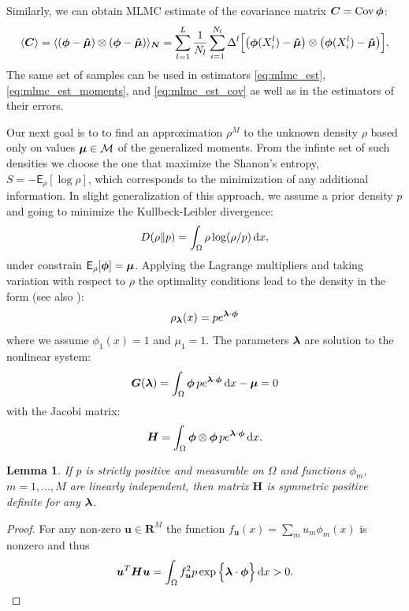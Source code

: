 \documentclass{article}
\newtheorem{lemma}[theorem]{Lemma}
\def\d{\,{\rm d}}               %
\def\vc#1{\mathbf{\boldsymbol{#1}}}     %
\def\tn#1{\boldsymbol{#1}}
\def \E{{\mathsf E}}
\def\R{\mathbf{R}}
\def\avg#1{\langle#1\rangle}
\def\Cov{\mathop{\rm Cov}}
\begin{document}
Similarly, we can obtain MLMC estimate of the covariance matrix $\tn C = \Cov{\vc\phi}$: 
\begin{equation}
    \label{eq:mlmc_est_cov}
    \avg{\tn C} = \avg{(\vphi - \estvmu)\otimes(\vphi - \estvmu)}_{\vc N} = 
    \sum_{l=1}^L \frac{1}{N_l} \sum_{i=1}^{N_l} \Delta^l\Big[ 
    \big(\vphi(X_i^l) - \estvmu\big)\otimes\big(\vphi(X_i^l) - \estvmu\big)\Big].
\end{equation}
The same set of samples can be used in estimators \eqref{eq:mlmc_est}, \eqref{eq:mlmc_est_moments}, and \eqref{eq:mlmc_est_cov} as well as in the estimators of their errors.


Our next goal is to to find an approximation $\rho^M$ to the unknown density $\rho$ based only on values $\vmu \in \mathcal M$ of the generalized moments. From the infinte set of such densities we choose the one that maximize the Shanon's entropy,
$S = -\E_\rho[\log \rho]$,
which corresponds to the minimization of any additional information. 
In slight generalization of this approach, we assume a prior density $p$ and going to minimize the Kullbeck-Leibler divergence:
\[
    D(\rho\Vert p) = \int_\Omega \rho \log(\rho / p) \d x,
\]
under constrain $\E_\rho[ \vphi ] = \vmu$. 
Applying the Lagrange multipliers and taking variation with respect to $\rho$ the optimality conditions lead to the density in the form (see also \cite{...}):
\[
    \rho_{\vl}(x) = p e^{\vl\cdot\vphi}
\]
where we assume $\phi_1(x) = 1$ and $\mu_1 =1$. The parameters $\vl$ are solution
to the nonlinear system:
\begin{equation}
    \label{eq:moment_system}
    \vc G(\vl) = \int_\Omega \vphi\, p e^{\vl\cdot \vphi}\d x - \vmu = 0
\end{equation}
with the Jacobi matrix:
\[
    \tn H = \int_\Omega \vphi \otimes \vphi\, 
    p e^{\vl\cdot\vphi} \d x.
\]
\begin{lemma}
If $p$ is strictly positive and measurable on $\Omega$ and functions $\phi_m$,  $m=1,\dots,M$ are linearly independent, then matrix $\tn H$ is symmetric positive definite for any $\vl$.
\end{lemma}
\begin{proof}
For any non-zero $\vc u \in \R^M$ the function $f_{\vc u}(x) = \sum_m u_m \phi_m(x)$ is nonzero and thus
\[
    \vc u^T \tn H \vc u = \int_{\Omega} f_{\vc u}^2 p \exp\Big\{ \vc\lambda\cdot \vc\phi\Big\} \d x > 0.
\]
\end{proof}
\end{document}
